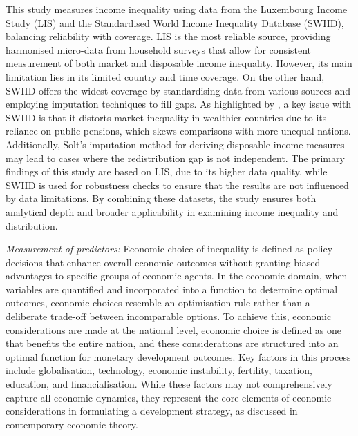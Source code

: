 \documentclass[12pt]{article}
\begin{document}
This study measures income inequality using data from the Luxembourg Income Study (LIS) and the Standardised World Income Inequality Database (SWIID), balancing reliability with coverage. LIS is the most reliable source, providing harmonised micro-data from household surveys that allow for consistent measurement of both market and disposable income inequality. However, its main limitation lies in its limited country and time coverage. On the other hand, SWIID offers the widest coverage by standardising data from various sources and employing imputation techniques to fill gaps. As highlighted by \textcite{galbraith2014utip}, a key issue with SWIID is that it distorts market inequality in wealthier countries due to its reliance on public pensions, which skews comparisons with more unequal nations. Additionally, Solt's imputation method for deriving disposable income measures may lead to cases where the redistribution gap is not independent. The primary findings of this study are based on LIS, due to its higher data quality, while SWIID is used for robustness checks to ensure that the results are not influenced by data limitations. By combining these datasets, the study ensures both analytical depth and broader applicability in examining income inequality and distribution.

\textit{Measurement of predictors:} Economic choice of inequality is defined as policy decisions that enhance overall economic outcomes without granting biased advantages to specific groups of economic agents. In the economic domain, when variables are quantified and incorporated into a function to determine optimal outcomes, economic choices resemble an optimisation rule rather than a deliberate trade-off between incomparable options. To achieve this, economic considerations are made at the national level, economic choice is defined as one that benefits the entire nation, and these considerations are structured into an optimal function for monetary development outcomes. Key factors in this process include globalisation, technology, economic instability, fertility, taxation, education, and financialisation. While these factors may not comprehensively capture all economic dynamics, they represent the core elements of economic considerations in formulating a development strategy, as discussed in contemporary economic theory. 
\end{document}
